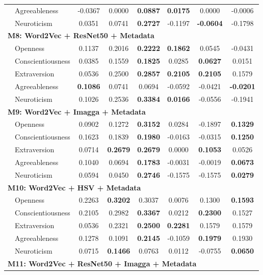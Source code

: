 \begin{longtable}{llcccccc}
& Agreeableness & -0.0367 & 0.0000 & \textbf{0.0887} & \textbf{0.0175} & 0.0000 & -0.0006 \\
& Neuroticism & 0.0351 & 0.0741 & \textbf{0.2727} & -0.1197 & \textbf{-0.0604} & -0.1798 \\
\hline
\multicolumn{8}{l}{\textbf{M8: Word2Vec + ResNet50 + Metadata}} \\
& Openness & 0.1137 & 0.2016 & \textbf{0.2222} & \textbf{0.1862} & 0.0545 & -0.0431 \\
& Conscientiousness & 0.0385 & 0.1559 & \textbf{0.1825} & 0.0285 & \textbf{0.0627} & 0.0151 \\
& Extraversion & 0.0536 & 0.2500 & \textbf{0.2857} & \textbf{0.2105} & \textbf{0.2105} & 0.1579 \\
& Agreeableness & \textbf{0.1086} & 0.0741 & 0.0694 & -0.0592 & -0.0421 & \textbf{-0.0201} \\
& Neuroticism & 0.1026 & 0.2536 & \textbf{0.3384} & \textbf{0.0166} & -0.0556 & -0.1941 \\
\hline
\multicolumn{8}{l}{\textbf{M9: Word2Vec + Imagga + Metadata}} \\
& Openness & 0.0902 & 0.1272 & \textbf{0.3152} & 0.0284 & -0.1897 & \textbf{0.1329} \\
& Conscientiousness & 0.1623 & 0.1839 & \textbf{0.1980} & -0.0163 & -0.0315 & \textbf{0.1250} \\
& Extraversion & 0.0714 & \textbf{0.2679} & \textbf{0.2679} & 0.0000 & \textbf{0.1053} & 0.0526 \\
& Agreeableness & 0.1040 & 0.0694 & \textbf{0.1783} & -0.0031 & -0.0019 & \textbf{0.0673} \\
& Neuroticism & 0.0594 & 0.0450 & \textbf{0.2746} & -0.1575 & -0.1575 & \textbf{0.0279} \\
\hline
\multicolumn{8}{l}{\textbf{M10: Word2Vec + HSV + Metadata}} \\
& Openness & 0.2263 & \textbf{0.3202} & 0.3037 & 0.0076 & 0.1300 & \textbf{0.1593} \\
& Conscientiousness & 0.2105 & 0.2982 & \textbf{0.3367} & 0.0212 & \textbf{0.2300} & 0.1527 \\
& Extraversion & 0.0536 & 0.2321 & \textbf{0.2500} & \textbf{0.2281} & 0.1579 & 0.1579 \\
& Agreeableness & 0.1278 & 0.1091 & \textbf{0.2145} & -0.1059 & \textbf{0.1979} & 0.1930 \\
& Neuroticism & 0.0715 & \textbf{0.1466} & 0.0763 & 0.0112 & -0.0755 & \textbf{0.0650} \\
\hline
\multicolumn{8}{l}{\textbf{M11: Word2Vec + ResNet50 + Imagga + Metadata}} \\

\end{longtable}

